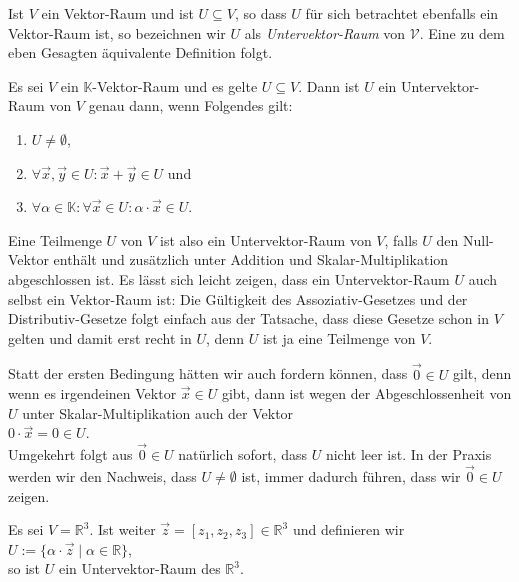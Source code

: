 Ist $V$ ein Vektor-Raum und ist $U \subseteq V$, so dass $U$ f\"{u}r sich betrachtet ebenfalls ein
Vektor-Raum ist, so bezeichnen wir $U$ als
\emph{Untervektor-Raum} von $\mathcal{V}$.  Eine zu dem eben Gesagten \"{a}quivalente Definition folgt.

\begin{Definition}
Es sei $V$ ein $\mathbb{K}$-Vektor-Raum und es gelte $U \subseteq V$.
Dann ist $U$ ein Untervektor-Raum von $V$ genau dann, 
wenn Folgendes gilt:
\begin{enumerate}
\item $U \not= \emptyset$,
\item $\forall \vec{x}, \vec{y} \in U: \vec{x} + \vec{y} \in U$ \quad und \quad
\item $\forall \alpha \in \mathbb{K}: \forall \vec{x} \in U: \alpha \cdot \vec{x} \in U$.  \eoxs
\end{enumerate}
\end{Definition}

Eine Teilmenge $U$ von $V$ ist also ein Untervektor-Raum von $V$, falls $U$ den Null-Vektor enth\"{a}lt und zus\"{a}tzlich
unter Addition und Skalar-Multiplikation abgeschlossen ist.  Es l\"{a}sst sich leicht zeigen, dass ein Untervektor-Raum $U$
auch selbst ein Vektor-Raum ist:  Die G\"{u}ltigkeit des Assoziativ-Gesetzes und der Distributiv-Gesetze folgt einfach aus
der Tatsache, dass diese Gesetze schon in $V$ gelten und damit erst recht in $U$, denn $U$ ist ja eine Teilmenge von
$V$. 

\remark
Statt der ersten Bedingung h\"{a}tten wir auch fordern k\"{o}nnen, dass $\vec{0} \in U$ gilt, denn wenn es
irgendeinen Vektor $\vec{x} \in U$ gibt,  dann ist wegen der Abgeschlossenheit von $U$ unter
Skalar-Multiplikation auch der Vektor
\\[0.2cm]
\hspace*{1.3cm}
$0 \cdot \vec{x} = 0 \in U$.  
\\[0.2cm]
Umgekehrt folgt aus $\vec{0} \in U$ nat\"{u}rlich sofort, dass $U$ nicht leer ist.  In der Praxis werden
wir den Nachweis, dass $U \not= \emptyset$ ist, immer dadurch f\"{u}hren, dass wir $\vec{0} \in U$
zeigen. 
\eoxs

\example
Es sei $V = \mathbb{R}^3$.  Ist weiter $\vec{z} = [ z_1, z_2, z_3 ] \in \mathbb{R}^3$ und definieren wir
\\[0.2cm]
\hspace*{1.3cm}
$U := \{ \alpha \cdot \vec{z} \mid \alpha \in \mathbb{R} \}$,
\\[0.2cm]
so ist $U$ ein Untervektor-Raum des $\mathbb{R}^3$.


